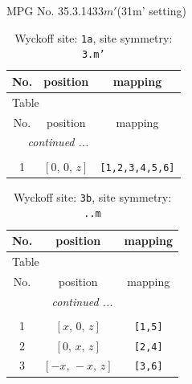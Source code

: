 \documentclass[fleqn,8pt]{jsarticle}
\begin{document}
\setcounter{MaxMatrixCols}{32}

\renewcommand{\tablename}{Table~}
\renewcommand{\figurename}{Figure~}
\begin{center}
\LARGE
MPG No. 35.3.143\quad$3m'$\quad(31m' setting)
\end{center}
\renewcommand{\arraystretch}{1.2}
\begin{longtable}{ccc}
\caption{Wyckoff site: {\tt 1a}, site symmetry: {\tt 3.m'}}
 \\
 \hline \hline
No. & position & mapping \\ \hline \endfirsthead

\multicolumn{2}{l}{\tablename\ \thetable{}} \\
 \hline \hline
No. & position & mapping \\ \hline \endhead

 \hline \hline
\multicolumn{2}{r}{\footnotesize\it continued ...} \\ \endfoot

 \hline \hline
\multicolumn{2}{r}{} \\ \endlastfoot

1 & $\left[ 0,\, 0,\, z \right]$ & {\tt [1,2,3,4,5,6]} \\
\end{longtable}
\renewcommand{\arraystretch}{1.2}
\begin{longtable}{ccc}
\caption{Wyckoff site: {\tt 3b}, site symmetry: {\tt ..m}}
 \\
 \hline \hline
No. & position & mapping \\ \hline \endfirsthead

\multicolumn{2}{l}{\tablename\ \thetable{}} \\
 \hline \hline
No. & position & mapping \\ \hline \endhead

 \hline \hline
\multicolumn{2}{r}{\footnotesize\it continued ...} \\ \endfoot

 \hline \hline
\multicolumn{2}{r}{} \\ \endlastfoot

1 & $\left[ x,\, 0,\, z \right]$ & {\tt [1,5]} \\ \hline
2 & $\left[ 0,\, x,\, z \right]$ & {\tt [2,4]} \\ \hline
3 & $\left[ - x,\, - x,\, z \right]$ & {\tt [3,6]} \\
\end{longtable}
\renewcommand{\arraystretch}{1.2}
\end{document}
